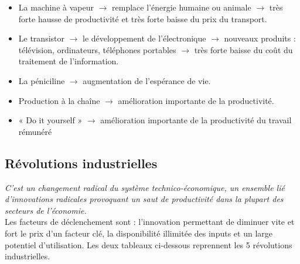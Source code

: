 \begin{itemize}
	\item La machine à vapeur $\rightarrow$ remplace l’énergie humaine ou animale $\rightarrow$ très forte hausse de productivité et très forte baisse du prix du transport.
	
	\item Le transistor $\rightarrow$ le développement de l’électronique $\rightarrow$ nouveaux produits : télévision, ordinateurs, téléphones portables $\rightarrow$ très forte baisse du coût du traitement de l’information.
	
	\item La péniciline $\rightarrow$ augmentation de l'espérance de vie.
	
	\item Production à la chaîne $\rightarrow$ amélioration importante de la productivité.
	
	\item « Do it yourself » $\rightarrow$ amélioration importante de la productivité du travail rémunéré
\end{itemize}

\subsection{Révolutions industrielles}
\textit{C'est un changement radical du système technico-économique, un ensemble lié d’innovations radicales provoquant un saut de productivité dans la plupart des secteurs
de l’économie.} \\
Les facteurs de déclenchement sont : l'innovation permettant de diminuer vite et fort le prix d'un facteur clé, la disponibilité illimitée des inputs et un large  potentiel d'utilisation. Les deux tableaux ci-dessous reprennent les 5 révolutions industrielles. \\

